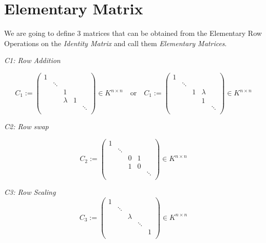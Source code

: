 \newpage
\section{Elementary Matrix}

We are going to define 3 matrices that can be obtained from the Elementary Row
Operations on the \emph{Identity Matrix} and call them \emph{Elementary Matrices}.
\vspace{\baselineskip}

\emph{C1: Row Addition}

\[
C_1 := 
\begin{pmatrix}
1      &        &        &        &        \\
       & \ddots &        &        &        \\
       &        & 1      &        &        \\
       &        & \lambda & 1     &        \\
       &        &        &        & \ddots \\
\end{pmatrix}
\in K^{n \times n}
\quad \text{or} \quad
C_1 := 
\begin{pmatrix}
1      &        &        &        &        \\
       & \ddots &        &        &        \\
       &        & 1      & \lambda &        \\
       &        &        & 1      &        \\
       &        &        &        & \ddots \\
\end{pmatrix}
\in K^{n \times n}
\]


\emph{C2: Row swap}

\[
C_2 := 
\begin{pmatrix}
1      &        &        &        &        \\
       & \ddots &        &        &        \\
       &        & 0      & 1      &        \\
       &        & 1      & 0      &        \\
       &        &        &        & \ddots \\
\end{pmatrix}
\in K^{n \times n}
\]


\emph{C3: Row Scaling}
\[
C_3 := 
\begin{pmatrix}
1      &        &        &        &        \\
       & \ddots &        &        &        \\
       &        & \lambda &       &        \\
       &        &        & \ddots &        \\
       &        &        &        & 1      \\
\end{pmatrix}
\in K^{n \times n}
\]

